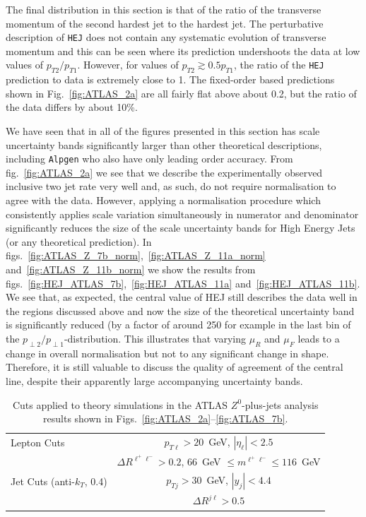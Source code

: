 		The final distribution in this section is that of the ratio of the transverse
		momentum of the second hardest jet to the hardest jet.  The perturbative
		description of \texttt{HEJ} does not contain any systematic evolution of transverse
		momentum and this can be seen where its prediction undershoots the data at low
		values of $p_{T2}/p_{T1}$.  However, for values of $p_{T2} \gtrsim 0.5 p_{T1}$,
		the ratio of the \texttt{HEJ} prediction to data is extremely close to 1.  The
		fixed-order based predictions shown in Fig.~\eqref{fig:ATLAS_2a} are all fairly
		flat above about 0.2, but the ratio of the data differs by about 10\%.

		We have seen that in all of the figures presented in this section \HEJ has scale uncertainty bands
		significantly larger than other theoretical descriptions, including \texttt{Alpgen} who also
		have only leading order accuracy.  From fig.~\eqref{fig:ATLAS_2a} we see that we describe
		the experimentally observed inclusive two jet rate very well and, as such, do not require
		normalisation to agree with the data.  However, applying a normalisation procedure which
		consistently applies scale variation simultaneously in numerator and denominator significantly
		reduces the size of the scale uncertainty bands for High Energy Jets (or any theoretical prediction).
		In figs.~\eqref{fig:ATLAS_Z_7b_norm},~\eqref{fig:ATLAS_Z_11a_norm} and~\eqref{fig:ATLAS_Z_11b_norm}
		we show the results from figs.~\eqref{fig:HEJ_ATLAS_7b},~\eqref{fig:HEJ_ATLAS_11a} and~\eqref{fig:HEJ_ATLAS_11b}.
		We see that, as expected, the central value of HEJ still describes the data well in the
		regions discussed above and now the size of the theoretical uncertainty band is significantly
		reduced (by a factor of around 250 for example in the last bin of the
		$p_{\perp 2}/p_{\perp 1}$-distribution.  This illustrates that varying $\mu_R$ and $\mu_F$
		leads to a change in overall normalisation but not to any significant change in shape.  Therefore,
		it is still valuable to discuss the quality of agreement of the central line, despite their
		apparently large accompanying uncertainty bands.

		\begin{table}[bth]
		  \centering
		  \begin{tabular}{|l|c|}
		    \hline
		    Lepton Cuts & $p_{T\ell}>20$~GeV, \; $|\eta_\ell|<2.5$ \\
		    & $\Delta R^{\ell^+\ell^-} > 0.2$, \; $66$~GeV $\leq m^{\ell^+\ell^-} \leq
		      116$~GeV \\ \hline
		    Jet Cuts (anti-$k_T$, 0.4) & $p_{Tj}>30$~GeV, \; $|y_j|<4.4$ \\
		    & $\Delta R^{j\ell} >0.5$ \\
		\hline
		  \end{tabular}
		  \caption{Cuts applied to theory simulations in the ATLAS
		    $Z^0$-plus-jets analysis results shown in Figs.~\eqref{fig:ATLAS_2a}--\eqref{fig:ATLAS_7b}.}
		  \label{tab:atlascuts}
		\end{table}

